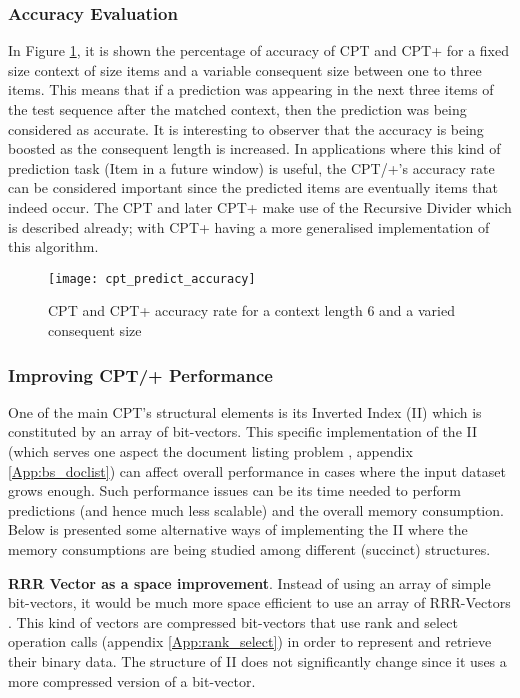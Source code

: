 \subsubsection{Accuracy Evaluation}{\label{AccEv}}
In Figure \ref{fig:cpt_predict_accuracy}, it is shown the percentage of accuracy of CPT and CPT+ for a fixed size context of size items and a variable consequent size between one to three items. This means that if a prediction was appearing in the next three items of the test sequence after the matched context, then the prediction was being considered as accurate. It is interesting to observer that the accuracy is being boosted as the consequent length is increased. In applications where this kind of prediction task (Item in a future window) is useful, the CPT/+'s accuracy rate can be considered important since the predicted items are eventually items that indeed occur. The CPT and later CPT+ make use of the Recursive Divider which is described already; with CPT+ having a more generalised implementation of this algorithm.
\begin{figure}[h]
    \centering
    \texttt{[image: cpt\_predict\_accuracy]}
    \caption{CPT and CPT+ accuracy rate for a context length 6 and a varied consequent size}
    \label{fig:cpt_predict_accuracy}
\end{figure}

\subsubsection{Improving CPT/+ Performance}{\label{cpt_improv}}
One of the main CPT's structural elements is its Inverted Index (II) which is constituted by an array of bit-vectors. This specific implementation of the II (which serves one aspect the document listing problem \cite{tabei_tsuda_2011}, appendix \ref{App:bs_doclist}) can affect overall performance in cases where the input dataset grows enough. Such performance issues can be its time needed to perform predictions (and hence much less scalable) and the overall memory consumption. Below is presented some alternative ways of implementing the II where the memory consumptions are being studied among different (succinct) structures.

\par\textbf{RRR Vector as a space improvement}. Instead of using an array of simple bit-vectors, it would be much more space efficient to use an array of RRR-Vectors \cite{Raman}. This kind of vectors are compressed bit-vectors that use rank and select operation calls (appendix \ref{App:rank_select}) in order to represent and retrieve their binary data. The structure of II does not significantly change since it uses a more compressed version of a bit-vector. 

